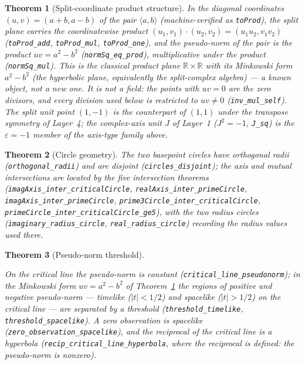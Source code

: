 \documentclass{article}
\newtheorem{theorem}{Theorem}[section]
\begin{document}
\begin{theorem}[Split-coordinate product structure]
\label{thm:jalg}
In the diagonal coordinates $(u,v)=(a+b,a-b)$ of the pair
$\langle a,b\rangle$ (machine-verified as \texttt{toProd}), the split
plane carries the coordinatewise product
$(u_1,v_1)\cdot(u_2,v_2)=(u_1u_2,v_1v_2)$ (\texttt{toProd\_add},
\texttt{toProd\_mul}, \texttt{toProd\_one}), and the pseudo-norm of the
pair is the product $uv=a^2-b^2$ (\texttt{normSq\_eq\_prod}),
multiplicative under the product
(\texttt{normSq\_mul}). This is the classical \emph{product plane}
$\mathbb R\times\mathbb R$ with its Minkowski form $a^2-b^2$ (the
hyperbolic plane, equivalently the split-complex algebra) --- a known
object, not a new one. It is not a field: the points with $uv=0$ are the
zero divisors, and every division used below is restricted to
$uv\neq0$ (\texttt{inv\_mul\_self}). The split unit point $(1,-1)$ is the
counterpart of $(1,1)$ under the transpose symmetry of Layer~4; the
complex-axis unit $J$ of Layer~1 ($J^2=-1$, \texttt{J\_sq}) is the
$\varepsilon=-1$ member of the axis-type family above.
\end{theorem}

\begin{theorem}[Circle geometry]
\label{thm:circles}
The two basepoint circles have orthogonal radii
(\texttt{orthogonal\_radii}) and are disjoint (\texttt{circles\_disjoint});
the axis and mutual intersections are located by the five intersection
theorems (\texttt{imagAxis\_inter\_criticalCircle},
\texttt{realAxis\_inter\_primeCircle},
\texttt{imagAxis\_inter\_primeCircle},
\texttt{prime3Circle\_inter\_criticalCircle},
\texttt{primeCircle\_inter\_criticalCircle\_ge5}), with the two radius
circles (\texttt{imaginary\_radius\_circle}, \texttt{real\_radius\_circle})
recording the radius values used there.
\end{theorem}

\begin{theorem}[Pseudo-norm threshold]
\label{thm:threshold}
\begin{sloppypar}On the critical line the pseudo-norm is constant
(\texttt{critical\_line\_pseudonorm}); in the Minkowski form
$uv=a^2-b^2$ of Theorem~\ref{thm:jalg} the regions of positive and
negative pseudo-norm --- \emph{timelike} ($|t|<1/2$) and
\emph{spacelike} ($|t|>1/2$) on the critical line --- are separated by a
threshold
(\texttt{threshold\_timelike}, \texttt{threshold\_spacelike}). A zero
observation is spacelike (\texttt{zero\_observation\_spacelike}), and the
reciprocal of the critical line is a hyperbola
(\texttt{recip\_critical\_line\_hyperbola}, where the reciprocal is
defined: the pseudo-norm is nonzero).\end{sloppypar}
\end{theorem}
\end{document}
